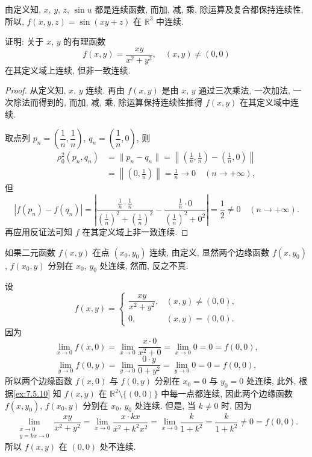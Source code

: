 \begin{solution}
由定义知, $x$, $y$, $z$, $\sin u$ 都是连续函数, 而加, 减, 乘, 除运算及复合都保持连续性, 所以, $f(x, y, z) = \sin(xy + z)$ 在 $\mathbb{R}^{3}$ 中连续.
\end{solution}

\begin{example}\label{ex:7.5.10}
证明: 关于 $x$, $y$ 的有理函数
\[
  f(x, y) = \frac{xy}{x^{2} + y^{2}}, \quad (x, y) \neq (0, 0)
\]
在其定义域上连续, 但非一致连续.
\end{example}

\begin{proof}
从定义知, $x$, $y$ 连续. 再由 $f(x, y)$ 是由 $x$, $y$ 通过三次乘法, 一次加法, 一次除法而得到的, 而加, 减, 乘, 除运算保持连续性推得 $f(x, y)$ 在其定义域中连续.

取点列 $p_{n} = \left(\dfrac{1}{n}, \dfrac{1}{n}\right)$, $q_{n} = \left(\dfrac{1}{n}, 0\right)$, 则
\begin{align*}
  \rho_{0}^{2}(p_{n}, q_{n}) &= \|p_{n} - q_{n}\| = \left\|\left(\frac{1}{n}, \frac{1}{n}\right) - \left(\frac{1}{n}, 0\right)\right\| \\
  &= \left\|\left(0, \frac{1}{n}\right)\right\| = \frac{1}{n} \to 0 \quad (n \to +\infty),
\end{align*}
但
\[
  |f(p_{n}) - f(q_{n})| = \left|\frac{\frac{1}{n} \cdot \frac{1}{n}}{\left(\frac{1}{n}\right)^{2} + \left(\frac{1}{n}\right)^{2}} - \frac{\frac{1}{n} \cdot 0}{\left(\frac{1}{n}\right)^{2} + 0^{2}}\right| = \frac{1}{2} \neq 0 \quad (n \to +\infty).
\]
再应用反证法可知 $f$ 在其定义域上非一致连续.\qedhere
\end{proof}

如果二元函数 $f(x, y)$ 在点 $(x_{0}, y_{0})$ 连续, 由定义, 显然两个边缘函数 $f(x, y_{0})$, $f(x_{0}, y)$ 分别在 $x_{0}$, $y_{0}$ 处连续, 然而, 反之不真.

\begin{example}\label{ex:7.5.11}
设
\[
  f(x, y) =
  \begin{cases}
    \dfrac{xy}{x^{2} + y^{2}}, & (x, y) \neq (0, 0), \\[2.5mm]
    0, & (x, y) = (0, 0).
  \end{cases}
\]
因为
\[
  \lim_{x \to 0} f(x, 0) = \lim_{x \to 0} \frac{x \cdot 0}{x^{2} + 0} = \lim_{x \to 0} 0 = 0 = f(0, 0),
\]
\[
  \lim_{y \to 0} f(0, y) = \lim_{y \to 0} \frac{0 \cdot y}{0 + y^{2}} = \lim_{y \to 0} 0 = 0 = f(0, 0),
\]
所以两个边缘函数 $f(x, 0)$ 与 $f(0, y)$ 分别在 $x_{0} = 0$ 与 $y_{0} = 0$ 处连续, 此外, 根据\cref{ex:7.5.10} 知 $f(x, y)$ 在 $\mathbb{R}^{2} \setminus \{(0, 0)\}$ 中每一点都连续, 因此两个边缘函数 $f(x, y_{0})$, $f(x_{0}, y)$ 分别在 $x_{0}$, $y_{0}$ 处连续. 但是, 当 $k \neq 0$ 时, 因为
\[
  \lim_{\substack{x \to 0 \\ y = kx \to 0}} \frac{xy}{x^{2} + y^{2}} = \lim_{x \to 0} \frac{x \cdot kx}{x^{2} + k^{2}x^{2}} = \lim_{x \to 0} \frac{k}{1 + k^{2}} = \frac{k}{1 + k^{2}} \neq 0 = f(0, 0).
\]
所以 $f(x, y)$ 在 $(0, 0)$ 处不连续.\qedhere
\end{example}

